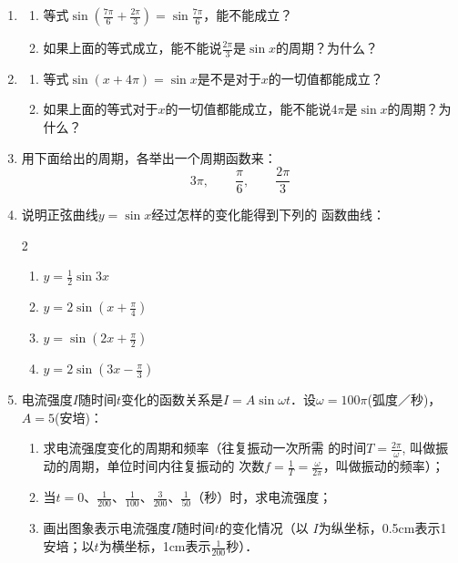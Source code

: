 \begin{enumerate}
\item \begin{enumerate}
    \item 等式$\sin\left(\frac{7\pi}{6}+\frac{2\pi}{3}\right)=\sin\frac{7\pi}{6}$，能不能成立？
    \item 如果上面的等式成立，能不能说$\frac{2\pi}{3}$是$\sin x$的周期？为什么？
\end{enumerate}

\item \begin{enumerate}
    \item 等式$\sin(x+4\pi)=\sin x$是不是对于$x$的一切值都能成立？
    \item 如果上面的等式对于$x$的一切值都能成立，能不能说$4\pi$是$\sin x$的周期？为什么？
\end{enumerate}

\item 用下面给出的周期，各举出一个周期函数来：
\[3\pi,\qquad \frac{\pi}{6},\qquad \frac{2\pi}{3}\]

\item 说明正弦曲线$y=\sin x$经过怎样的变化能得到下列的
函数曲线：
\begin{multicols}{2}
\begin{enumerate}
    \item $y=\frac{1}{2}\sin 3x$
    \item $y=2\sin\left(x+\frac{\pi}{4}\right)$
    \item $y=\sin\left(2x+\frac{\pi}{2}\right)$
    \item $y=2\sin\left(3x-\frac{\pi}{3}\right)$
\end{enumerate}
\end{multicols}

\item 电流强度$I$随时间$t$变化的函数关系是$I=A\sin\omega t$．设$\omega=100\pi$(弧度／秒)，$A=5$(安培)：
\begin{enumerate}
    \item 求电流强度变化的周期和频率（往复振动一次所需
的时间$T=\frac{2\pi}{\omega}$, 叫做振动的周期，单位时间内往复振动的
次数$f=\frac{1}{T}=\frac{\omega}{2\pi}$，叫做振动的频率）；
\item 当$t=0$、$\frac{1}{200}$、$\frac{1}{100}$、$\frac{3}{200}$、$\frac{1}{50}$（秒）时，求电流强度；
\item 画出图象表示电流强度$I$随时间$t$的变化情况（以
$I$为纵坐标，0.5cm表示1安培；以$t$为横坐标，1cm表示$\frac{1}{200}$秒）．
\end{enumerate}


\end{enumerate}
